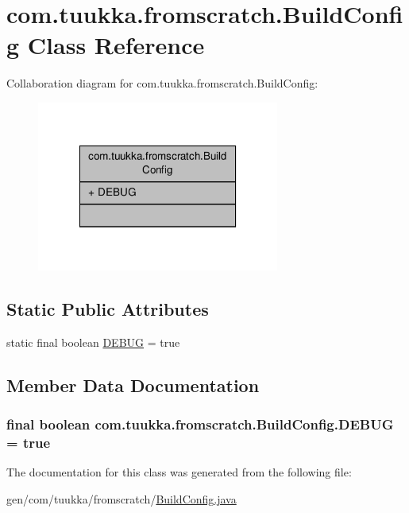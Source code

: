\hypertarget{classcom_1_1tuukka_1_1fromscratch_1_1BuildConfig}{\section{com.\-tuukka.\-fromscratch.\-Build\-Config Class Reference}
\label{classcom_1_1tuukka_1_1fromscratch_1_1BuildConfig}
}


Collaboration diagram for com.\-tuukka.\-fromscratch.\-Build\-Config\-:
\nopagebreak
\begin{figure}[H]
\begin{center}
\leavevmode
\includegraphics[width=226pt]{classcom_1_1tuukka_1_1fromscratch_1_1BuildConfig__coll__graph}
\end{center}
\end{figure}
\subsection*{Static Public Attributes}
\begin{DoxyCompactItemize}
\item 
static final boolean \hyperlink{classcom_1_1tuukka_1_1fromscratch_1_1BuildConfig_a0ee977c60db1caa42d16f94dd93d52e3}{D\-E\-B\-U\-G} = true
\end{DoxyCompactItemize}


\subsection{Member Data Documentation}
\hypertarget{classcom_1_1tuukka_1_1fromscratch_1_1BuildConfig_a0ee977c60db1caa42d16f94dd93d52e3}{
\subsubsection[{D\-E\-B\-U\-G}]{\setlength{\rightskip}{0pt plus 5cm}final boolean com.\-tuukka.\-fromscratch.\-Build\-Config.\-D\-E\-B\-U\-G = true\hspace{0.3cm}{\ttfamily [static]}}}\label{classcom_1_1tuukka_1_1fromscratch_1_1BuildConfig_a0ee977c60db1caa42d16f94dd93d52e3}


The documentation for this class was generated from the following file\-:\begin{DoxyCompactItemize}
\item 
gen/com/tuukka/fromscratch/\hyperlink{BuildConfig_8java}{Build\-Config.\-java}\end{DoxyCompactItemize}
